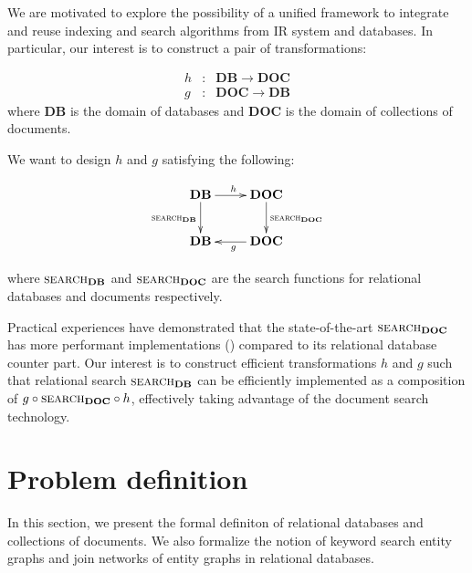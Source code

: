 \documentclass[conference]{IEEEtran}
\newcommand{\op}[1]{{\textsc{#1}}}
\newcommand{\DB}{\mathbf{DB}}
\newcommand{\DOC}{\mathbf{DOC}}
\begin{document}
We are motivated to explore the possibility of a unified framework to integrate and reuse indexing and search algorithms from IR system and databases.  In particular, our interest is to construct a pair of transformations:

\begin{eqnarray*}
h &:& \mathbf{DB} \to \mathbf{DOC} \\
g &:& \mathbf{DOC} \to \mathbf{DB}
\end{eqnarray*}
where $\mathbf{DB}$ is the domain of databases and $\mathbf{DOC}$ is the domain of collections of documents.

We want to design $h$ and $g$ satisfying the following:

\begin{displaymath}
\xymatrix {
    \mathbf{DB} \ar[r]^h\ar[d]_{\op{search}_\mathbf{DB}} 
        & \mathbf{DOC}\ar[d]^{\op{search}_\mathbf{DOC}} \\
    \mathbf{DB} & \mathbf{DOC}\ar[l]^g
}
\end{displaymath}

where $\op{search}_\DB$ and $\op{search}_\DOC$ are the search functions for relational databases and documents respectively.

Practical experiences have demonstrated that the state-of-the-art $\op{search}_\DOC$ has more performant implementations (\cite{xapian,lucene}) compared to its relational database counter part.  Our interest is to construct efficient transformations $h$ and $g$ such that relational search $\op{search}_\DB$ can be efficiently implemented as a composition of $g\circ \op{search}_\DOC\circ h$, effectively taking advantage of the document search technology.

\section{Problem definition}

In this section, we present the formal definiton of relational databases and collections of documents.  We also formalize the notion of keyword search entity graphs and join networks of entity graphs in relational databases.



\end{document}
